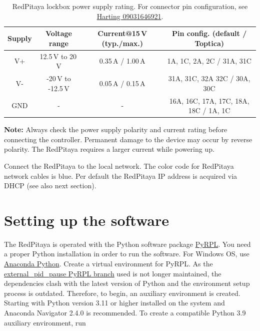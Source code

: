 \documentclass[twoside,a4paper]{refart}
\begin{document}
\begin{maxipage}
	\centering
	\begin{table}[H]
		{\small
		\begin{tabular}{|c|c|c|c|}\hline
			\textbf{Supply} & \textbf{Voltage range} & \textbf{Current@15\,V (typ./max.)}	& \textbf{Pin config. (default / Toptica)}  \\\hline
			V+			& 12.5\,V to 20\,V		& 	 0.35\,A / 1.00\,A					& 1A, 1C, 2A, 2C	/  31A, 31C	 \\\hline	
			V-			& -20\,V to -12.5\,V 	&		0.05\,A / 0.15\,A					& 31A, 31C, 32A 32C	/ 30A, 30C\\\hline	 
			GND			& -					&	-										& 16A, 16C, 17A, 17C, 18A, 18C  /  1A, 1C              \\\hline
		\end{tabular}
	}
		\caption{RedPitaya lockbox power supply rating. For connector pin configuration, see \href{https://b2b.harting.com/files/download/PRD/PDF_TS/0903164X921_100072506DRW176A.pdf}{Harting 09031646921}. \label{tab:power}}
	\end{table}
\end{maxipage}

\textbf{Note:} Always check the power supply polarity and current rating before connecting the controller. Permanent damage to the device may occur by reverse polarity. The RedPitaya requires a larger current while powering up.

 Connect the RedPitaya to the local network. The color code for RedPitaya network cables is blue. Per default the RedPitaya IP address is acquired via DHCP (see also next section). 

\section{Setting up the software}

The RedPitaya is operated with the Python software package \href{https://github.com/pyrpl-fpga/pyrpl}{PyRPL}. You need a proper Python installation in order to run the software. For Windows OS, use \href{https://www.anaconda.com/}{Anaconda Python}. Create a virtual environment for PyRPL. As the \href{https://github.com/pyrpl-fpga/pyrpl/tree/external_pid_pause}{external\_pid\_pause PyRPL branch} used is not longer maintained, the dependencies clash with the latest version of Python and the environment setup process is outdated. Therefore, to begin, an auxiliary environment is created. Starting with Python version 3.11 or higher installed on the system and Anaconda Navigator 2.4.0 is recommended. To create a compatible Python 3.9 auxiliary environment, run
\end{document}
